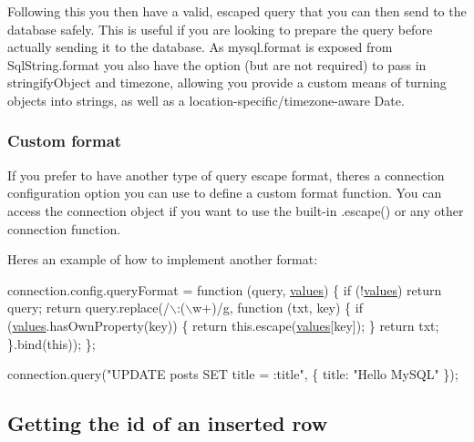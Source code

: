 Following this you then have a valid, escaped query that you can then send to the database safely. This is useful if you are looking to prepare the query before actually sending it to the database. As mysql.\+format is exposed from Sql\+String.\+format you also have the option (but are not required) to pass in stringify\+Object and timezone, allowing you provide a custom means of turning objects into strings, as well as a location-\/specific/timezone-\/aware Date.

\subsubsection*{Custom format}

If you prefer to have another type of query escape format, there\textquotesingle{}s a connection configuration option you can use to define a custom format function. You can access the connection object if you want to use the built-\/in {\ttfamily .escape()} or any other connection function.

Here\textquotesingle{}s an example of how to implement another format\+:


\begin{DoxyCode}
connection.config.queryFormat = \textcolor{keyword}{function} (query, \hyperlink{qtextcodec_8cpp_a48ca6217f9d5d1de9776060e1a8dbe58}{values}) \{
  \textcolor{keywordflow}{if} (!\hyperlink{qtextcodec_8cpp_a48ca6217f9d5d1de9776060e1a8dbe58}{values}) \textcolor{keywordflow}{return} query;
  \textcolor{keywordflow}{return} query.replace(/\(\backslash\):(\(\backslash\)w+)/\hyperlink{058__bracket__recursion_8tcl_af08b4b5bfa9edf0b0a7dee1c2b2c29e0}{g}, \textcolor{keyword}{function} (txt, key) \{
    \textcolor{keywordflow}{if} (\hyperlink{qtextcodec_8cpp_a48ca6217f9d5d1de9776060e1a8dbe58}{values}.hasOwnProperty(key)) \{
      \textcolor{keywordflow}{return} this.escape(\hyperlink{qtextcodec_8cpp_a48ca6217f9d5d1de9776060e1a8dbe58}{values}[key]);
    \}
    \textcolor{keywordflow}{return} txt;
  \}.bind(\textcolor{keyword}{this}));
\};

connection.query(\textcolor{stringliteral}{"UPDATE posts SET title = :title"}, \{ title: \textcolor{stringliteral}{"Hello MySQL"} \});
\end{DoxyCode}


\subsection*{Getting the id of an inserted row}


